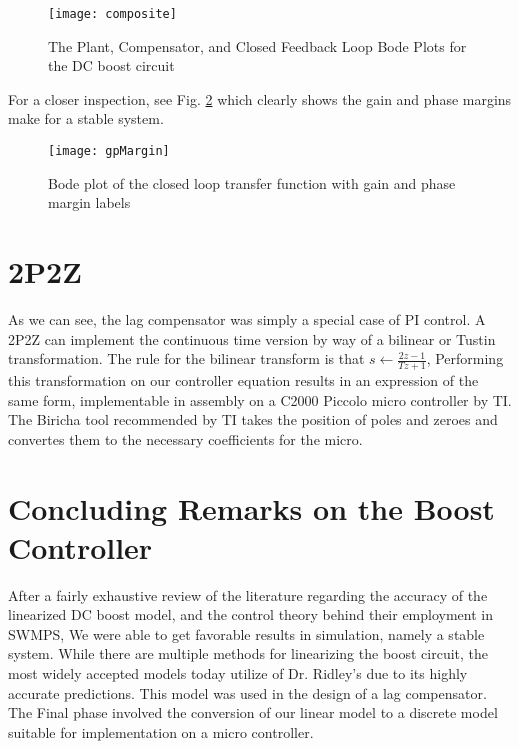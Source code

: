 \begin{figure}[htbp]
\begin{center}
\texttt{[image: composite]}
\caption{The Plant, Compensator, and Closed Feedback Loop Bode Plots for the DC boost circuit}
\label{composite}
\end{center}
\end{figure}

For a closer inspection, see Fig. \ref{gpMargin} which clearly shows the gain and phase margins make for a stable system. 

\begin{figure}[htbp]
\begin{center}
\texttt{[image: gpMargin]}
\caption{Bode plot of the closed loop transfer function with gain and phase margin labels}
\label{gpMargin}
\end{center}
\end{figure}

\section{2P2Z}
As we can see, the lag compensator was simply a special case of PI control. A 2P2Z can implement the continuous time version by way of a bilinear or Tustin transformation. The rule for the bilinear transform is that $s\leftarrow\frac{2z-1}{Tz+1}$, Performing this transformation on our controller equation results in an expression of the same form, implementable in assembly on a C2000 Piccolo micro controller by TI. The Biricha tool recommended by TI takes the position of poles and zeroes and convertes them to the necessary coefficients for the micro.

\section{Concluding Remarks on the Boost Controller}
After a fairly exhaustive review of the literature regarding the accuracy of the linearized DC boost model, and the control theory behind their employment in SWMPS, We were able to get favorable results in simulation, namely a stable system. While there are multiple methods for linearizing the boost circuit, the most widely accepted models today utilize of Dr. Ridley's due to its highly accurate predictions. This model was used in the design of a lag compensator. The Final phase involved the conversion of our linear model to a discrete model suitable for implementation on a micro controller.